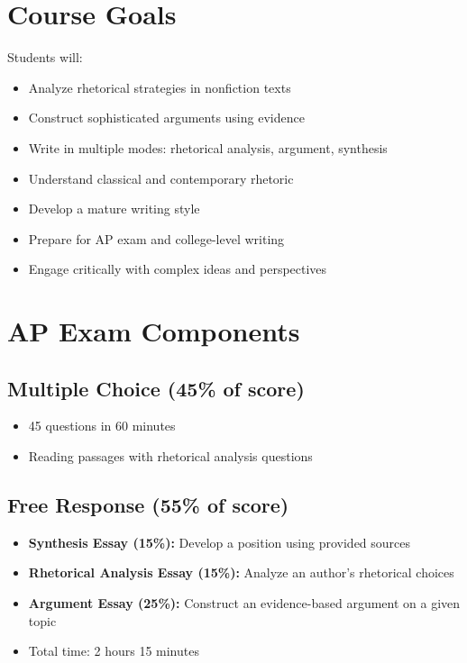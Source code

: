 \documentclass[12pt,oneside]{book}
\begin{document}
\section{Course Goals}
Students will:
\begin{itemize}[leftmargin=2em]
    \item Analyze rhetorical strategies in nonfiction texts
    \item Construct sophisticated arguments using evidence
    \item Write in multiple modes: rhetorical analysis, argument, synthesis
    \item Understand classical and contemporary rhetoric
    \item Develop a mature writing style
    \item Prepare for AP exam and college-level writing
    \item Engage critically with complex ideas and perspectives
\end{itemize}

\section{AP Exam Components}
\subsection*{Multiple Choice (45\% of score)}
\begin{itemize}[leftmargin=2em]
    \item 45 questions in 60 minutes
    \item Reading passages with rhetorical analysis questions
\end{itemize}

\subsection*{Free Response (55\% of score)}
\begin{itemize}[leftmargin=2em]
    \item \textbf{Synthesis Essay (15\%):} Develop a position using provided sources
    \item \textbf{Rhetorical Analysis Essay (15\%):} Analyze an author's rhetorical choices
    \item \textbf{Argument Essay (25\%):} Construct an evidence-based argument on a given topic
    \item Total time: 2 hours 15 minutes
\end{itemize}
\end{document}
